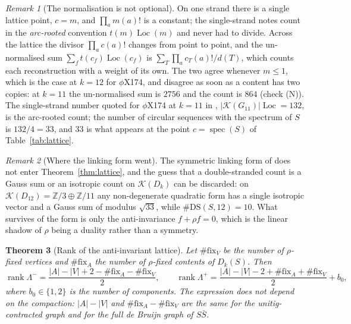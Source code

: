 \documentclass[11pt]{article}
\theoremstyle{plain}
\newtheorem{theorem}{Theorem}
\theoremstyle{definition}
\theoremstyle{remark}
\newtheorem{remark}[theorem]{Remark}
\newcommand{\Z}{\mathbb{Z}}
\newcommand{\K}{\mathcal{K}}
\newcommand{\rank}{\operatorname{rank}}
\newcommand{\spec}{\operatorname{spec}}
\newcommand{\Loc}{\operatorname{Loc}}
\newcommand{\DS}{\mathrm{DS}}
\newcommand{\Lm}{\Lambda^{-}}
\newcommand{\Lp}{\Lambda^{+}}
\begin{document}
\begin{remark}[The normalisation is not optional]\label{rem:norm}
On one strand there is a single lattice point, $c=m$, and $\prod_a m(a)!$ is a constant; the
single-strand notes count in the \emph{arc-rooted} convention $t(m)\Loc(m)$ and never had to
divide. Across the lattice the divisor $\prod_a c(a)!$ changes from point to point, and the
un-normalised sum $\sum_f t(c_f)\Loc(c_f)$ is $\sum_T \prod_a c_T(a)!/d(T)$, which counts each
reconstruction with a weight of its own. The two agree whenever $m\le1$, which is the case at
$k=12$ for $\phi$X174, and disagree as soon as a content has two copies: at $k=11$ the
un-normalised sum is $2756$ and the count is $864$ (check (N)). The single-strand number
quoted for $\phi$X174 at $k=11$ in \cite{Bio1}, $|\K(G_{11})|\Loc=132$, is the arc-rooted
count; the number of circular sequences with the spectrum of $S$ is $132/4=33$, and $33$ is
what appears at the point $c=\spec(S)$ of Table~\ref{tab:lattice}.
\end{remark}

\begin{remark}[Where the linking form went]
The symmetric linking form of \cite[Rem.~5]{Bio7} does not enter Theorem~\ref{thm:lattice},
and the guess that a double-stranded count is a Gauss sum or an isotropic count on $\K(D_k)$
can be discarded: on $\K(D_{12})=\Z/3\oplus\Z/11$ any non-degenerate quadratic form has a
single isotropic vector and a Gauss sum of modulus $\sqrt{33}$, while $\#\DS(S,12)=10$. What
survives of the form is only the anti-invariance $f+\rho f=0$, which is the linear shadow of
$\rho$ being a duality rather than a symmetry.
\end{remark}

\begin{theorem}[Rank of the anti-invariant lattice]\label{thm:rank}
Let $\#\mathrm{fix}_V$ be the number of $\rho$-fixed vertices and $\#\mathrm{fix}_A$ the
number of $\rho$-fixed contents of $D_k(S)$. Then
\[
  \rank\Lm=\frac{|A|-|V|+2-\#\mathrm{fix}_A-\#\mathrm{fix}_V}{2},\qquad
  \rank\Lp=\frac{|A|-|V|-2+\#\mathrm{fix}_A+\#\mathrm{fix}_V}{2}+b_0 ,
\]
where $b_0\in\{1,2\}$ is the number of components. The expression does not depend on the
compaction: $|A|-|V|$ and $\#\mathrm{fix}_A-\#\mathrm{fix}_V$ are the same for the
unitig-contracted graph and for the full de Bruijn graph of $S\bar S$.
\end{theorem}
\end{document}
